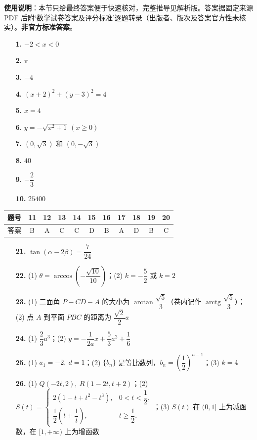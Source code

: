 
\begin{gknotice}
\textbf{使用说明}：本节只给最终答案便于快速核对，完整推导见解析版。答案据固定来源 PDF 后附‘数学试卷答案及评分标准’逐题转录（出版者、版次及答案官方性未核实）。\textbf{非官方标准答案}。
\end{gknotice}

\begin{itemize}[leftmargin=2.6em]
  \item[\textbf{1.}] $-2<x<0$
  \item[\textbf{2.}] $\pi$
  \item[\textbf{3.}] $-4$
  \item[\textbf{4.}] $(x+2)^2+(y-3)^2=4$
  \item[\textbf{5.}] $x=4$
  \item[\textbf{6.}] $y=-\sqrt{x^2+1}\ (x\ge0)$
  \item[\textbf{7.}] $(0,\sqrt3)$ 和 $(0,-\sqrt3)$
  \item[\textbf{8.}] $40$
  \item[\textbf{9.}] $-\dfrac23$
  \item[\textbf{10.}] $25400$
\end{itemize}

\begin{center}\begin{tabular}{ccccccccccc}
\toprule
题号 & 11 & 12 & 13 & 14 & 15 & 16 & 17 & 18 & 19 & 20 \\
\midrule
答案 & B & A & C & C & D & B & A & D & B & C \\
\bottomrule
\end{tabular}\end{center}

\begin{itemize}[leftmargin=2.6em]
  \item[\textbf{21.}] $\tan(\alpha-2\beta)=\dfrac7{24}$
  \item[\textbf{22.}] (1) $\theta=\arccos\left(-\dfrac{\sqrt{10}}{10}\right)$；(2) $k=-\dfrac52$ 或 $k=2$
  \item[\textbf{23.}] (1) 二面角 $P-CD-A$ 的大小为 $\arctan\dfrac{\sqrt5}{3}$（卷内记作 $\operatorname{arctg}\dfrac{\sqrt5}{3}$）；(2) 点 $A$ 到平面 $PBC$ 的距离为 $\dfrac{\sqrt2}{2}a$
  \item[\textbf{24.}] (1) $\dfrac23a^3$；(2) $y=-\dfrac1{2a}x+\dfrac53a^2+\dfrac16$
  \item[\textbf{25.}] (1) $a_1=-2,\ d=1$；(2) $\{b_n\}$ 是等比数列，$b_n=\left(\dfrac12\right)^{n-1}$；(3) $k=4$
  \item[\textbf{26.}] (1) $Q(-2t,2),\ R(1-2t,t+2)$；(2) $\displaystyle S(t)=\begin{cases}2(1-t+t^2-t^3),&0<t<\dfrac12,\\[2pt]\dfrac12\left(t+\dfrac1t\right),&t\ge\dfrac12.\end{cases}$；(3) $S(t)$ 在 $(0,1]$ 上为减函数，在 $[1,+\infty)$ 上为增函数
\end{itemize}
